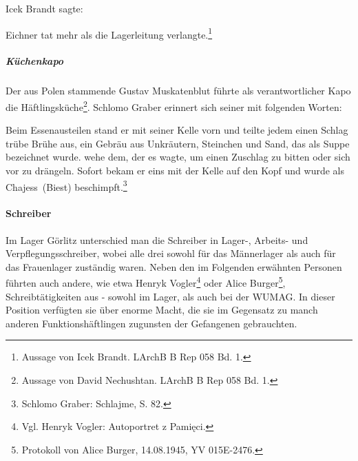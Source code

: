 \documentclass[a4paper,12pt,ngerman,
]{nisebook}
\begin{document}
Icek Brandt sagte:
\begin{leftbar}
Eichner tat mehr als die Lagerleitung verlangte.\footnote{Aussage von Icek Brandt. LArchB B Rep 058 Bd. 1.}
\end{leftbar}


 \subparagraph{Küchenkapo}
Der aus Polen stammende Gustav Muskatenblut führte als verantwortlicher Kapo die Häftlingsküche\footnote{Aussage von David Nechushtan. LArchB B Rep 058 Bd. 1.}. Schlomo Graber erinnert sich seiner mit folgenden Worten:
\begin{leftbar}
Beim Essenausteilen stand er mit seiner Kelle vorn und teilte jedem einen Schlag trübe Brühe aus, ein Gebräu aus Unkräutern, Steinchen und Sand, das als Suppe bezeichnet wurde. wehe dem, der es wagte, um einen Zuschlag zu bitten oder sich vor zu drängeln. Sofort bekam er eins mit der Kelle auf den Kopf und wurde als \glqq Chajess\grqq~(\glqq Biest\grqq) beschimpft.\footnote{Schlomo Graber: Schlajme, S. 82.}
\end{leftbar}

\paragraph{Schreiber}
\label{schreiber}
Im Lager Görlitz unterschied man die Schreiber in Lager-, Arbeits- und Ver\-pfleg\-ungs\-schreiber, wobei alle drei sowohl für das Männerlager als auch für das Frauenlager zuständig waren. Neben den im Folgenden erwähnten Personen führten auch andere, wie etwa Henryk Vogler\footnote{Vgl. Henryk Vogler: Autoportret z Pamięci.} oder Alice Burger\footnote{Protokoll von Alice Burger, 14.08.1945, YV 015E-2476.}, Schreibtätigkeiten aus - sowohl im Lager, als auch bei der WUMAG.
In dieser Position verfügten sie über enorme Macht, die sie im Gegensatz zu manch anderen Funktionshäftlingen zugunsten der Gefangenen gebrauchten.
\end{document}
